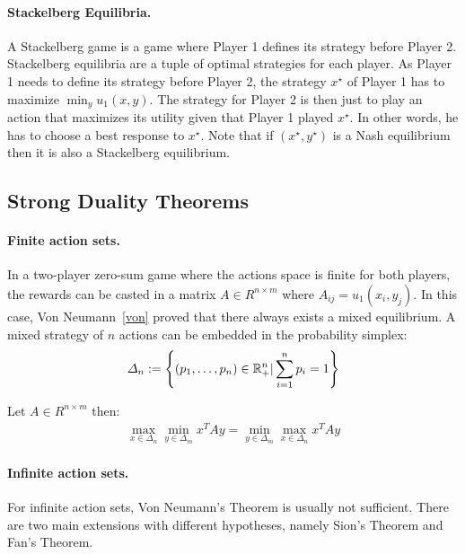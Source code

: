 \paragraph{Stackelberg Equilibria.} A Stackelberg game is a game where Player 1 defines its strategy before Player 2. Stackelberg equilibria are a tuple of optimal strategies for each player. As Player 1 needs to define its strategy before Player 2, the strategy $x^\star$ of Player 1 has to maximize $\min_y u_1(x,y)$. The strategy for Player 2 is then just to play an action that maximizes its utility given that Player 1 played $x^\star$. In other words, he has to choose a best response to $x^\star$. Note that if $(x^\star,y^\star)$ is a Nash equilibrium then it is also a Stackelberg equilibrium.



\subsection{Strong Duality Theorems}

\paragraph{Finite action sets.} In a two-player zero-sum game where the actions space is finite for both players, the rewards can be casted in a matrix $A\in R^{n\times m}$ where $A_{ij} =u_1(x_i,y_j)$. In this case, Von Neumann~\ref{von} proved that there always exists a mixed equilibrium. A mixed strategy of $n$ actions can be embedded in the probability simplex:
\begin{align*}
    \Delta_n := \left\{(p_1,\dots,p_n)\in\RR_+^n| \sum_{i=1}^n p_i = 1  \right\}
\end{align*}

\begin{thm}
    Let $A\in R^{n\times m}$ then:
    \begin{align*}
        \max_{x\in \Delta_n}\min_{y\in \Delta_m} x^TAy = \min_{y\in \Delta_m}\max_{x\in \Delta_n} x^TAy
    \end{align*}
\end{thm}

\paragraph{Infinite action sets.} For infinite action sets, Von Neumann's Theorem is usually not sufficient. There are two main extensions with different hypotheses, namely Sion's Theorem and Fan's Theorem.

